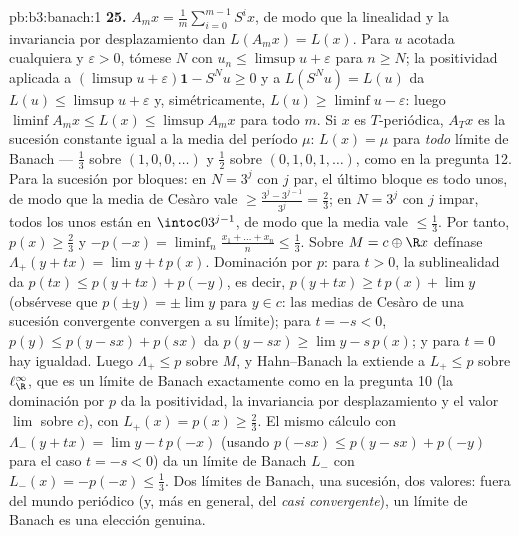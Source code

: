 \begin{solution}{pb:b3:banach:1}
\textbf{25.} $A_mx = \frac1m\sum_{i=0}^{m-1}S^ix$, de modo que la
linealidad y la invariancia por desplazamiento dan $L(A_mx) = L(x)$.
Para $u$ acotada cualquiera y $\varepsilon > 0$, tómese $N$ con
$u_n \leq
\limsup u + \varepsilon$ para $n \geq N$; la positividad aplicada a
$(\limsup u + \varepsilon)\mathbf 1 - S^Nu \geq 0$ y a $L(S^Nu) = L(u)$
da $L(u) \leq \limsup u + \varepsilon$ y, simétricamente,
$L(u) \geq \liminf u - \varepsilon$: luego
$\liminf A_mx \leq L(x) \leq \limsup A_mx$ para todo $m$. Si $x$ es
$T$-periódica, $A_Tx$ es la sucesión constante igual a la media del
período $\mu$: $L(x) = \mu$ para \emph{todo} límite de Banach ---
$\frac13$ sobre $(1,0,0,\dots)$ y $\frac12$ sobre $(0,1,0,1,\dots)$,
como en la pregunta 12. Para la sucesión por bloques: en $N = 3^j$ con
$j$ par, el último bloque es todo unos, de modo que la media de Cesàro
vale $\geq \frac{3^j - 3^{j-1}}{3^j} = \frac23$; en $N = 3^j$ con $j$
impar, todos los unos están en $\intoc0
{3^{j-1}}$, de modo que la media vale $\leq \frac13$. Por tanto,
$p(x) \geq
\frac23$ y $-p(-x) = \liminf_n\frac{x_1 + \dots + x_n}n
\leq \frac13$. Sobre $M = c \oplus \R x$ defínase $\Lambda_+(y +
tx) = \lim y + t\,p(x)$. Dominación por $p$: para $t > 0$, la
sublinealidad da $p(tx) \leq p(y + tx) + p(-y)$, es decir,
$p(y + tx) \geq t\,p(x) + \lim y$ (obsérvese que $p(\pm y) = \pm\lim
y$ para $y \in c$: las medias de Cesàro de una sucesión convergente
convergen a su límite); para $t = -s < 0$, $p(y) \leq p(y -
sx) + p(sx)$ da $p(y - sx) \geq \lim y - s\,p(x)$; y para $t
= 0$ hay igualdad. Luego $\Lambda_+ \leq p$ sobre $M$, y Hahn--Banach la
extiende a $L_+ \leq p$ sobre $\ell^\infty_\R$, que es un límite de
Banach exactamente como en la pregunta 10 (la dominación por $p$ da la
positividad, la invariancia por desplazamiento y el valor $\lim$ sobre
$c$), con $L_+(x) = p(x) \geq \frac23$. El mismo cálculo con
$\Lambda_-(y + tx) = \lim y - t\,p(-x)$ (usando
$p(-sx) \leq p(y - sx) + p(-y)$ para el caso $t = -s
< 0$) da un límite de Banach $L_-$ con $L_-(x) = -p(-x) \leq
\frac13$. Dos límites de Banach, una sucesión, dos valores: fuera del
mundo periódico (y, más en general, del \emph{casi convergente}), un
límite de Banach es una elección genuina.
\end{solution}
